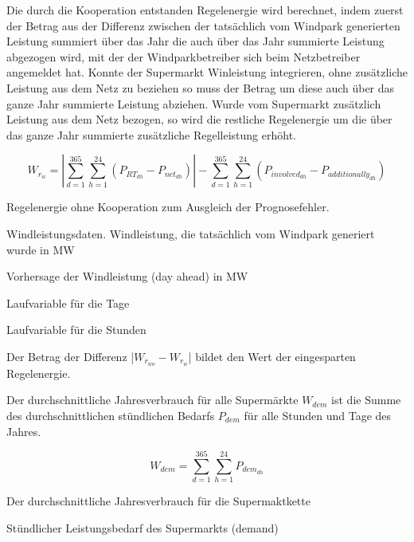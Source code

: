 Die durch die Kooperation entstanden Regelenergie wird berechnet, indem zuerst
der Betrag aus der Differenz zwischen der tats\"achlich vom Windpark generierten
Leistung summiert \"uber das Jahr die auch \"uber das Jahr summierte Leistung
abgezogen wird, mit der der Windparkbetreiber sich beim Netzbetreiber angemeldet
hat. Konnte der Supermarkt Winleistung integrieren, ohne zus\"atzliche Leistung
aus dem Netz zu beziehen so muss der Betrag um diese auch \"uber das ganze Jahr
summierte Leistung abziehen. Wurde vom Supermarkt zus\"atzlich Leistung aus dem
Netz bezogen, so wird die restliche Regelenergie um die \"uber das ganze Jahr
summierte zus\"atzliche Regelleistung erh\"oht.

\begin{equation}
W_{r_{w}} = |\sum^{365}_{d=1}\sum^{24}_{h=1}(P_{RT_{dh}}-P_{net_{dh}})| -
\sum^{365}_{d=1}\sum^{24}_{h=1}(P_{involved_{dh}} - P_{additionally_{dh}})
\label{eq:wrw}
\end{equation}

\begin{description}[\dth]
\item[$W_{r_{wo}}$] Regelenergie ohne Kooperation zum Ausgleich der
Prognosefehler.
\item[$P_{RT}$] Windleistungsdaten. Windleistung, die tats\"achlich vom
Windpark generiert wurde in MW
\item[$P_{DA}$] Vorhersage der Windleistung (day ahead) in MW
\item[$d$] Laufvariable f\"ur die Tage
\item[$h$] Laufvariable f\"ur die Stunden
\end{description}

Der Betrag der Differenz |$W_{r_{wo}}- W_{r_{w}}$| bildet den Wert der
eingesparten Regelenergie.

Der durchschnittliche Jahresverbrauch f\"ur alle Superm\"arkte $W_{dem}$ ist die
Summe des durchschnittlichen st\"undlichen Bedarfs $P_{dem}$ f\"ur alle Stunden
und Tage des Jahres.

\begin{equation}
W_{dem} = \sum^{365}_{d=1}\sum^{24}_{h=1}P_{dem_{dh}}
\label{eq:wdem}
\end{equation}

\begin{description}[\dth]
\item[$W_{dem}$] Der durchschnittliche Jahresverbrauch f\"ur die Supermaktkette
\item[$P_{dem}$] St\"undlicher Leistungsbedarf des Supermarkts (demand)
\end{description}

